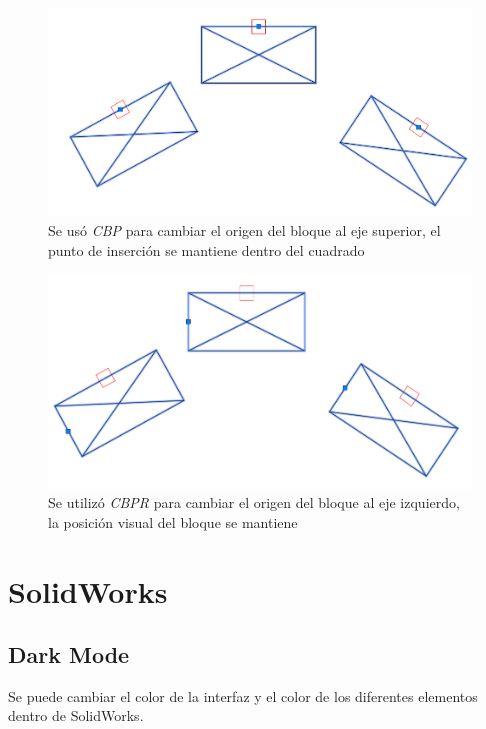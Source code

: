 \documentclass[12pt,letterpaper,final]{report}
\begin{document}
\begin{figure}[H]
	\centering
	\includegraphics[width=0.7\linewidth]{Imagenes/autocad_cbp_02}
	\caption{Se usó \emph{CBP} para cambiar el origen del bloque al eje superior, el punto de inserción se mantiene dentro del cuadrado}
	\label{fig:autocadcbp02}
\end{figure}

\begin{figure}[H]
	\centering
	\includegraphics[width=0.7\linewidth]{Imagenes/autocad_cbp_03}
	\caption{Se utilizó \emph{CBPR} para cambiar el origen del bloque al eje izquierdo, la posición visual del bloque se mantiene}
	\label{fig:autocadcbp03}
\end{figure}


\part{SolidWorks}

\chapter{Dark Mode}

Se puede cambiar el color de la interfaz y el color de los diferentes elementos dentro de SolidWorks.
\end{document}
